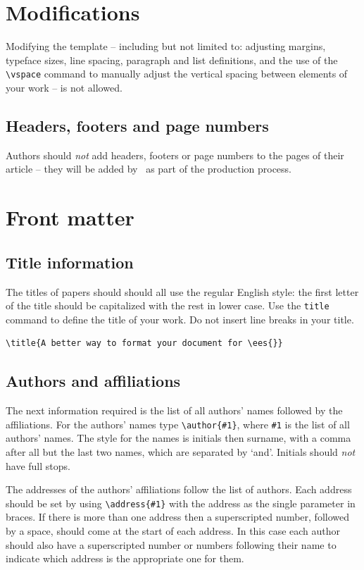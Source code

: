 \documentclass[a4paper]{jpconf}
\newcommand{\ees}{\textit{IOP~Conference Series: Earth and Environmental Science}}
\begin{document}
\section{Modifications}
\label{nomodify}

Modifying the template -- including but not limited to: adjusting
margins, typeface sizes, line spacing, paragraph and list definitions,
and the use of the \verb|\vspace| command to manually adjust the
vertical spacing between elements of your work -- is not allowed.

\subsection{Headers, footers and page numbers}
Authors should {\it not} add headers, footers or page numbers to the pages of their article -- they will be added by \iopp\ as part of the production process.


\section{Front matter}
\label{fpage}

\subsection{Title information}

The titles of papers should should all use the regular English style: the first letter of the title should be capitalized with the rest in lower case. Use the \verb|title| command to define the title of your work. Do not
insert line breaks in your title.
\begin{verbatim}
\title{A better way to format your document for \ees{}}
\end{verbatim}


\subsection{Authors and affiliations}

The next information required is the list of all authors' names followed by 
the affiliations. For the authors' names type \verb"\author{#1}", 
where \verb"#1" is the 
list of all authors' names. The style for the names is initials then
surname, with a comma after all but the last 
two names, which are separated by `and'. Initials should {\it not} have 
full stops. 

The addresses of the authors' affiliations follow the list of authors. 
Each address should be set by using
\verb"\address{#1}" with the address as the single parameter in braces. 
If there is more 
than one address then a superscripted number, followed by a space, should come at the start of
each address. In this case each author should also have a superscripted number or numbers following their name to indicate which address is the appropriate one for them.
\end{document}

